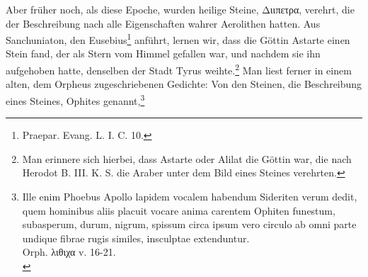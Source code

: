 \documentclass[a4paper, 11pt, oneside, polutonikogreek, german]{article}
\begin{document}
Aber früher noch, als diese Epoche, wurden heilige Steine, Διιπετρα, verehrt, die der Beschreibung nach alle Eigenschaften wahrer Aerolithen hatten. Aus Sanchuniaton, den Eusebius\footnote{Praepar. Evang. L. I. C. 10.} anführt, lernen wir, dass die Göttin Astarte einen Stein fand, der als Stern vom Himmel gefallen war, und nachdem sie ihn aufgehoben hatte, denselben der Stadt Tyrus weihte.\footnote{Man erinnere sich hierbei, dass Astarte oder Alilat die Göttin war, die nach Herodot B. III. K. S. die Araber unter dem Bild eines Steines verehrten.} Man liest ferner in einem alten, dem Orpheus zugeschriebenen Gedichte: Von den Steinen, die Beschreibung eines Steines, Ophites genannt,\footnote{Ille enim Phoebus Apollo lapidem vocalem habendum Sideriten verum dedit, quem hominibus aliis placuit vocare anima carentem Ophiten funestum, subasperum, durum, nigrum, spissum circa ipsum vero circulo ab omni parte undique fibrae rugis similes, insculptae extenduntur.\\
Orph. λιθιχα v. 16-21.\\
}
\end{document}
